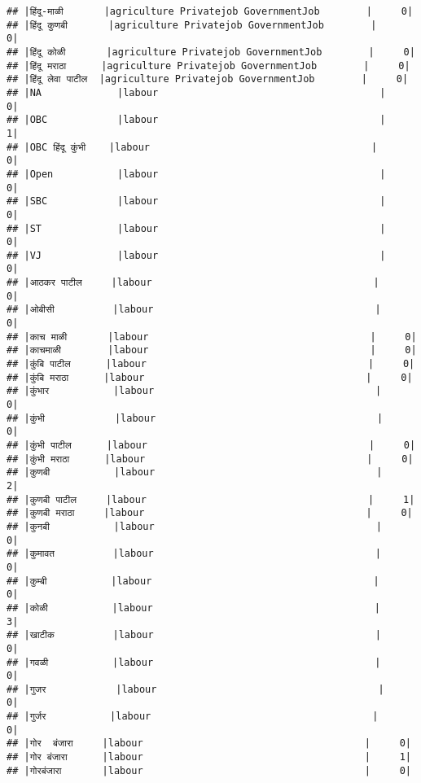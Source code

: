 \documentclass[
]{article}
\begin{document}
\begin{verbatim}
## |हिंदू-माळी       |agriculture Privatejob GovernmentJob        |     0|
## |हिंदू कुणबी       |agriculture Privatejob GovernmentJob        |     0|
## |हिंदू कोळी       |agriculture Privatejob GovernmentJob        |     0|
## |हिंदू मराठा      |agriculture Privatejob GovernmentJob        |     0|
## |हिंदू लेवा पाटील  |agriculture Privatejob GovernmentJob        |     0|
## |NA             |labour                                      |     0|
## |OBC            |labour                                      |     1|
## |OBC हिंदू कुंभी    |labour                                      |     0|
## |Open           |labour                                      |     0|
## |SBC            |labour                                      |     0|
## |ST             |labour                                      |     0|
## |VJ             |labour                                      |     0|
## |आठकर पाटील     |labour                                      |     0|
## |ओबीसी          |labour                                      |     0|
## |काच माळी       |labour                                      |     0|
## |काचमाळी        |labour                                      |     0|
## |कुंबि पाटील      |labour                                      |     0|
## |कुंबि मराठा      |labour                                      |     0|
## |कुंभार           |labour                                      |     0|
## |कुंभी            |labour                                      |     0|
## |कुंभी पाटील      |labour                                      |     0|
## |कुंभी मराठा      |labour                                      |     0|
## |कुणबी           |labour                                      |     2|
## |कुणबी पाटील     |labour                                      |     1|
## |कुणबी मराठा     |labour                                      |     0|
## |कुनबी           |labour                                      |     0|
## |कुमावत          |labour                                      |     0|
## |कुम्बी           |labour                                      |     0|
## |कोळी           |labour                                      |     3|
## |खाटीक          |labour                                      |     0|
## |गवळी           |labour                                      |     0|
## |गुजर            |labour                                      |     0|
## |गुर्जर           |labour                                      |     0|
## |गोर  बंजारा     |labour                                      |     0|
## |गोर बंजारा      |labour                                      |     1|
## |गोरबंजारा       |labour                                      |     0|

\end{verbatim}
\end{document}
